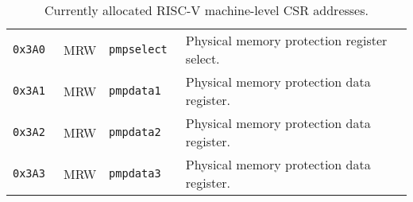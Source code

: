 \begin{table}[htb!]
\begin{center}
\begin{tabular}{|l|l|l|l|}
\tt 0x3A0 & MRW  &\tt pmpselect  & Physical memory protection register select. \\
\tt 0x3A1 & MRW  &\tt pmpdata1   & Physical memory protection data register. \\
\tt 0x3A2 & MRW  &\tt pmpdata2   & Physical memory protection data register. \\
\tt 0x3A3 & MRW  &\tt pmpdata3   & Physical memory protection data register. \\
\hline
\end{tabular}
\end{center}
\caption{Currently allocated RISC-V machine-level CSR addresses.}
\label{mcsrnames}
\end{table}

